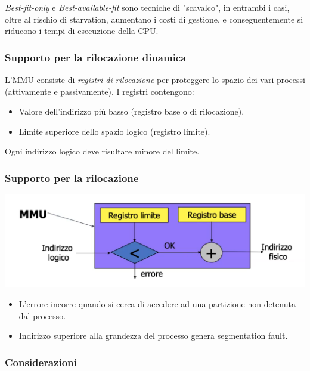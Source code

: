 \documentclass[a4paper,12pt, twoside]{report}
\begin{document}
\emph{Best-fit-only} e \emph{Best-available-fit} sono tecniche di "scavalco", in entrambi i
casi, oltre al rischio di starvation, aumentano i costi di gestione, e conseguentemente si 
riducono i tempi di esecuzione della CPU. 

\subsubsection{Supporto per la rilocazione dinamica}

L'MMU consiste di \emph{registri di rilocazione} per proteggere lo spazio dei vari processi 
(attivamente e passivamente). I registri contengono:
\begin{itemize}
    \item Valore dell'indirizzo pi\`u basso (registro base o di rilocazione).
    \item Limite superiore dello spazio logico (registro limite).
\end{itemize}
Ogni indirizzo logico deve risultare minore del limite. 

\subsubsection{Supporto per la rilocazione}

\begin{center}
    \includegraphics[scale=0.25]{mmuRelocation}
    \begin{itemize}

        \item L'errore incorre quando si cerca di accedere ad una partizione non detenuta dal processo.
        \item Indirizzo superiore alla grandezza del processo genera segmentation fault.
        \end{itemize}
    
\end{center}

\subsubsection{Considerazioni}
\end{document}
